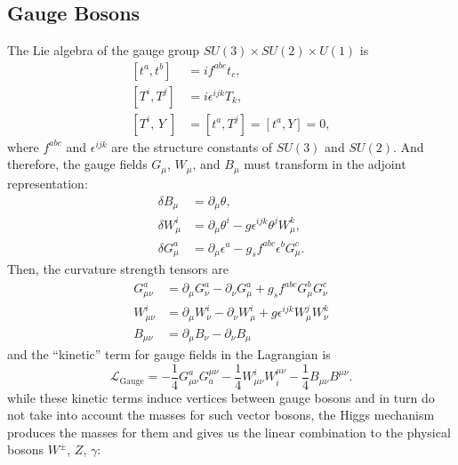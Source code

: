 \subsection{Gauge Bosons}

The Lie algebra of the gauge group $SU(3)\times SU(2)\times U(1)$ is
\begin{equation}
\begin{aligned}
	{\left[t^{a}, t^{b}\right] } &=i f^{a b c} t_{c}, \\
	{\left[T^{i}, T^{j}\right] } &=i \epsilon^{i j k} T_{k}, \\
	{\left[T^{i}, \, Y\;\right] } &=\left[t^{a}, T^{j}\right]=\left[t^{a}, Y\right]=0,
\end{aligned}
\end{equation}
where $f^{a b c}$ and $\epsilon^{i j k}$ are the structure constants of $SU(3)$ and $SU(2)$. And therefore, the gauge fields $G_\mu$, $W_\mu$, and $B_\mu$ must transform in the adjoint representation: 
\begin{equation}
	\begin{aligned}
		\delta B_{\mu} &=\partial_{\mu} \theta, \\
		\delta W_{\mu}^{i} &=\partial_{\mu} \theta^{i}-g \epsilon^{i j k} \theta^{j} W_{\mu}^{k}, \\
		\delta G_{\mu}^{a} &=\partial_{\mu} \epsilon^{a}-g_{s} f^{a b c} \epsilon^{b} G_{\mu}^{c}.
	\end{aligned}
\end{equation}
Then, the curvature strength tensors are
\begin{equation}
\begin{aligned}
	G_{\mu \nu}^{a} &=\partial_{\mu} G_{\nu}^{a}-\partial_{\nu} G_{\mu}^{a}+g_{s} f^{a b c} G_{\mu}^{b} G_{\nu}^{c} \\
	W_{\mu \nu}^{i} &=\partial_{\mu} W_{\nu}^{i}-\partial_{\nu} W_{\mu}^{i}+g \epsilon^{i j k} W_{\mu}^{j} W_{\nu}^{k} \\
	B_{\mu \nu} &=\partial_{\mu} B_{\nu}-\partial_{\nu} B_{\mu}
\end{aligned}
\end{equation}
and the ``kinetic'' term for gauge fields in the Lagrangian is  
\begin{equation}
\mathcal{L}_{\text{Gauge}}=-\frac{1}{4} G_{\mu \nu}^{a} G_{a}^{\mu \nu}-\frac{1}{4} W_{\mu \nu}^{i} W_{i}^{\mu \nu}-\frac{1}{4} B_{\mu \nu} B^{\mu \nu}.
\end{equation}
while these kinetic terms induce vertices between gauge bosons and in turn do not take into account the masses for such vector bosons, the Higgs mechanism produces the masses for them and gives us the linear combination to the physical bosons $W^\pm$, $Z$, $\gamma$:

